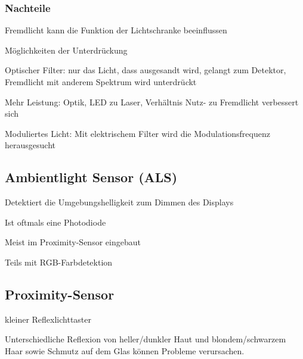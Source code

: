 \subsubsection{Nachteile}
\begin{compactitem}
    \item Fremdlicht kann die Funktion der Lichtschranke beeinflussen
    \item Möglichkeiten der Unterdrückung
    \begin{compactitem}
        \item Optischer Filter: nur das Licht, dass ausgesandt wird, gelangt zum Detektor, Fremdlicht mit anderem Spektrum wird unterdrückt
        \item Mehr Leistung: Optik, LED zu Laser, Verhältnis Nutz- zu Fremdlicht verbessert sich
        \item Moduliertes Licht: Mit elektrischem Filter wird die Modulationsfrequenz herausgesucht
    \end{compactitem}
\end{compactitem}

\begin{multicols}{2}
    \subsection{Ambientlight Sensor (ALS)}
    \begin{compactitem}
        \item Detektiert die Umgebungshelligkeit zum Dimmen des Displays
        \item Ist oftmals eine Photodiode
        \item Meist im Proximity-Sensor eingebaut
        \item Teils mit RGB-Farbdetektion
    \end{compactitem}
    
    \subsection{Proximity-Sensor}
    \begin{compactitem}
        \item kleiner Reflexlichttaster
        \item Unterschiedliche Reflexion von heller/dunkler Haut und blondem/schwarzem Haar sowie Schmutz auf dem Glas können Probleme verursachen.
    \end{compactitem}
\end{multicols}

